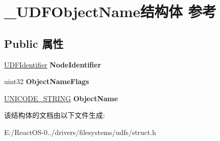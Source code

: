 \hypertarget{struct___u_d_f_object_name}{}\section{\+\_\+\+U\+D\+F\+Object\+Name结构体 参考}
\label{struct___u_d_f_object_name}
\subsection*{Public 属性}
\begin{DoxyCompactItemize}
\item 
\mbox{\label{struct___u_d_f_object_name_a42617c922be92cb10b9e71681a460b95}} 
\hyperlink{struct___u_d_f_identifier}{U\+D\+F\+Identifier} {\bfseries Node\+Identifier}
\item 
\mbox{\label{struct___u_d_f_object_name_ae8bd2bfa6850c107b61fcc0c070d896c}} 
uint32 {\bfseries Object\+Name\+Flags}
\item 
\mbox{\label{struct___u_d_f_object_name_aef6f3f55dd656ce698d60d2c9659fd1d}} 
\hyperlink{struct___u_n_i_c_o_d_e___s_t_r_i_n_g}{U\+N\+I\+C\+O\+D\+E\+\_\+\+S\+T\+R\+I\+NG} {\bfseries Object\+Name}
\end{DoxyCompactItemize}


该结构体的文档由以下文件生成\+:\begin{DoxyCompactItemize}
\item 
E\+:/\+React\+O\+S-\/0../drivers/filesystems/udfs/struct.\+h\end{DoxyCompactItemize}
